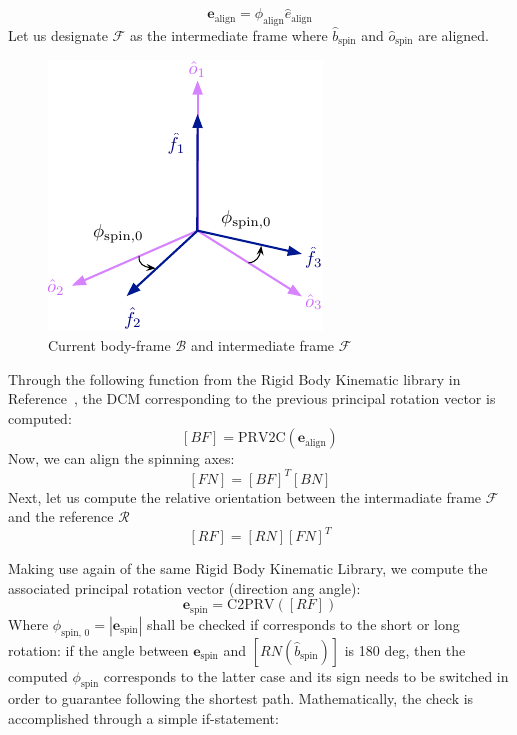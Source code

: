 \documentclass[]{AVSSimReportMemo}
\begin{document}
\begin{equation}
	\label{eq:e_align}
	\bm{e}_{\textrm{align}} = \phi_{\textrm{align}}\hat{e}_{\textrm{align}} 
\end{equation}
Let us designate $\mathcal{F}$ as the intermediate frame where $\hat {b}_{\textrm{spin}}$ and $\hat {o}_{\textrm{spin}}$ are aligned. 
\newline
\begin{figure}[htb]
	\centerline{
		\includegraphics{Figures/Fig3}
	}
	\caption{Current body-frame $\mathcal{B}$  and intermediate frame $\mathcal{F}$ }
	\label{fig:Fig3}
\end{figure} 
\newline
Through the following function from the Rigid Body Kinematic library in Reference~, the DCM corresponding to the previous principal rotation vector is computed:
\begin{equation}
	\label{eq:BF}
	[BF] = \textrm{PRV2C}(\bm{e}_{\textrm{align}})
\end{equation}
Now, we can align the spinning axes:
\begin{equation}
	\label{eq:FN}
	[FN] = [BF]^{T}[BN]
\end{equation}
Next, let us compute the relative orientation between the intermadiate frame $\mathcal{F}$ and the reference $\mathcal{R}$
\begin{equation}
	\label{eq:RF}
	[RF] = [RN][FN]^T
\end{equation}

Making use again of the same Rigid Body Kinematic Library, we compute the associated principal rotation vector (direction ang angle):
\begin{equation}
	\label{eq:e_spin}
	\bm{e}_{\textrm{spin}} = \textrm{C2PRV}([RF])
\end{equation}
Where $ \phi_{\textrm{spin, 0}} = |\bm{e}_{\textrm{spin}}| $ shall be checked if corresponds to the short or long rotation:
if the angle between $\bm{e}_{\textrm{spin}}$ and $[RN(\hat{b}_{\textrm{spin}})]$ is 180 deg, then the computed $\phi_{\textrm{spin}}$ corresponds to the latter case and its sign needs to be switched in order to guarantee following the shortest path. \newline
Mathematically, the check is accomplished through a simple if-statement:
\end{document}
